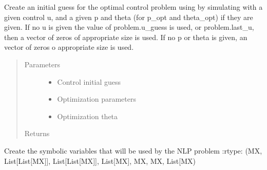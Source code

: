 \documentclass[letterpaper,10pt,english]{sphinxmanual}
\begin{document}
\begin{fulllineitems}
\begin{fulllineitems}
\label{\detokenize{yaocptool.methods.classic:yaocptool.methods.classic.multipleshooting.MultipleShootingScheme.create_initial_guess_with_simulation}}
Create an initial guess for the optimal control problem using by simulating with a given control u,
and a given p and theta (for p\_opt and theta\_opt) if they are given.
If no u is given the value of problem.u\_guess is used, or problem.last\_u, then a vector of zeros of appropriate
size is used.
If no p or theta is given, an vector of zeros o appropriate size is used.
\begin{quote}\begin{description}
\item[{Parameters}] \leavevmode\begin{itemize}
\item {} 
 \textendash{} Control initial guess

\item {} 
 \textendash{} Optimization parameters

\item {} 
 \textendash{} Optimization theta

\end{itemize}

\item[{Returns}] \leavevmode


\end{description}\end{quote}

\end{fulllineitems}


\begin{fulllineitems}
\label{\detokenize{yaocptool.methods.classic:yaocptool.methods.classic.multipleshooting.MultipleShootingScheme.create_nlp_symbolic_variables}}
Create the symbolic variables that will be used by the NLP problem
:rtype: (MX, List{[}List{[}MX{]}{]}, List{[}List{[}MX{]}{]}, List{[}MX{]}, MX, MX, List{[}MX)


\end{fulllineitems}
\end{fulllineitems}
\end{document}
